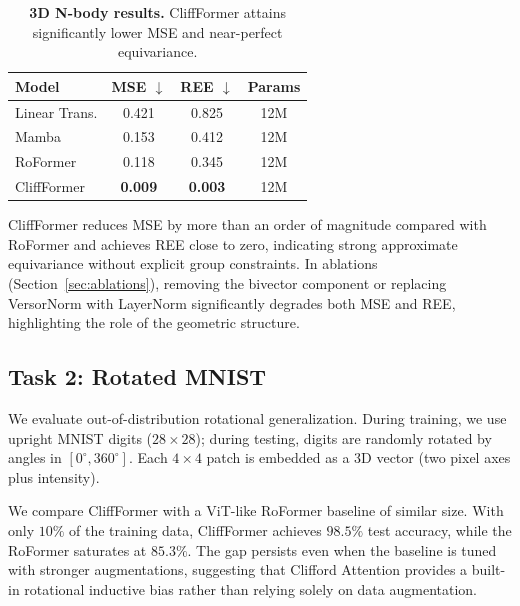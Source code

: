 \documentclass{article}
\theoremstyle{plain}
\theoremstyle{definition}
\theoremstyle{remark}
\begin{document}
\begin{table}[h]
\caption{\textbf{3D N-body results.} CliffFormer attains significantly lower MSE and near-perfect equivariance.}
\label{tab:nbody}
\vskip 0.1in
\begin{center}
\begin{small}
\begin{sc}
\begin{tabular}{lccc}
\toprule
Model & MSE $\downarrow$ & REE $\downarrow$ & Params \\
\midrule
Linear Trans. & 0.421 & 0.825 & 12M \\
Mamba & 0.153 & 0.412 & 12M \\
RoFormer & 0.118 & 0.345 & 12M \\
CliffFormer & \textbf{0.009} & \textbf{0.003} & 12M \\
\bottomrule
\end{tabular}
\end{sc}
\end{small}
\end{center}
\vskip -0.1in
\end{table}

CliffFormer reduces MSE by more than an order of magnitude compared with RoFormer and achieves REE close to zero, indicating strong approximate equivariance without explicit group constraints. In ablations (Section~\ref{sec:ablations}), removing the bivector component or replacing VersorNorm with LayerNorm significantly degrades both MSE and REE, highlighting the role of the geometric structure.

\subsection{Task 2: Rotated MNIST}

We evaluate out-of-distribution rotational generalization. During training, we use upright MNIST digits ($28\times28$); during testing, digits are randomly rotated by angles in $[0^\circ, 360^\circ]$. Each $4\times4$ patch is embedded as a 3D vector (two pixel axes plus intensity).

We compare CliffFormer with a ViT-like RoFormer baseline of similar size. With only $10\%$ of the training data, CliffFormer achieves $98.5\%$ test accuracy, while the RoFormer saturates at $85.3\%$. The gap persists even when the baseline is tuned with stronger augmentations, suggesting that Clifford Attention provides a built-in rotational inductive bias rather than relying solely on data augmentation.
\end{document}
